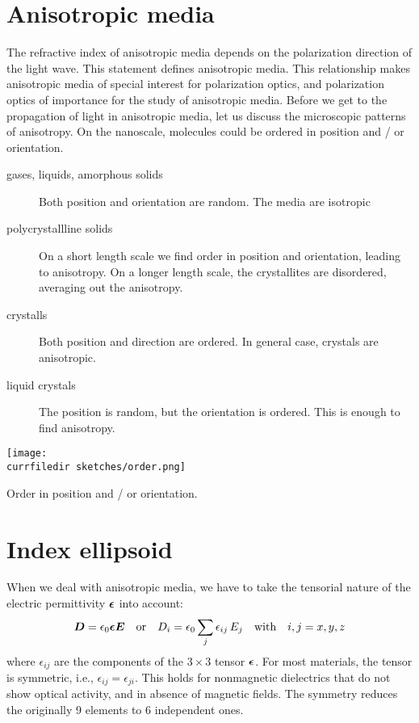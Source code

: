 \section{Anisotropic media} 

The refractive index of anisotropic media depends on the polarization direction of the light wave. This statement defines anisotropic media. This relationship makes anisotropic media of special interest for polarization optics, and polarization optics of importance for the study of anisotropic media. Before we get to the propagation of light in anisotropic media, let us discuss the microscopic patterns of  anisotropy. On the nanoscale, molecules could be ordered in position and / or orientation.
\begin{description}
    \item[gases, liquids, amorphous solids] Both position and orientation are random. The media are isotropic
    \item[polycrystallline solids] On a short length scale we find order in position and orientation, leading to anisotropy. On a longer length scale, the crystallites are disordered, averaging out the anisotropy. 
    \item[crystalls] Both position and direction are ordered. In general case, crystals are anisotropic. 
    \item[liquid crystals] The position is random, but the orientation is ordered. This is enough to find anisotropy. 
\end{description}

\begin{marginfigure}
    \texttt{[image: \\currfiledir sketches/order.png]}
    \caption{Order in position and / or orientation.}
\end{marginfigure}



\section{Index ellipsoid }

When we deal with anisotropic media, we have to take the tensorial nature of the electric permittivity $\boldsymbol{\epsilon}$ into account:
\begin{equation}
   \boldsymbol{D} = \epsilon_0 \boldsymbol{\epsilon} \boldsymbol{E} \quad \text{or} \quad  D_i = \epsilon_0 \sum_j \epsilon_{i j} \, E_j \quad \text{with} \quad i,j = x, y, z  \label{eq:5_eps_trensor}
\end{equation}
where $\epsilon_{i j} $ are the components of the $3\times 3$ tensor $\boldsymbol{\epsilon}$. For most materials, the tensor is symmetric, i.e., $\epsilon_{ij} = \epsilon_{ji}$.  This holds for nonmagnetic dielectrics that do not show optical activity, and in absence of magnetic fields. The symmetry reduces the originally 9 elements to 6 independent ones.

